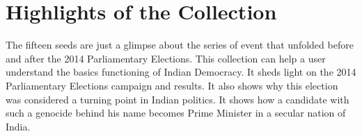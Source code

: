 \documentclass[11pt,journal,compsoc,onecolumn]{IEEEtran}
\begin{document}
\section{Highlights of the Collection}
The fifteen seeds are just a glimpse about the series of event that unfolded before and after the 2014 Parliamentary Elections. This collection can help a user understand the basics functioning of Indian Democracy. It sheds light on the 2014 Parliamentary Elections campaign and results. It also shows why this election was considered a turning point in Indian politics. It shows how a candidate with such a genocide behind his name becomes Prime Minister in a secular nation of India.  
\end{document}

